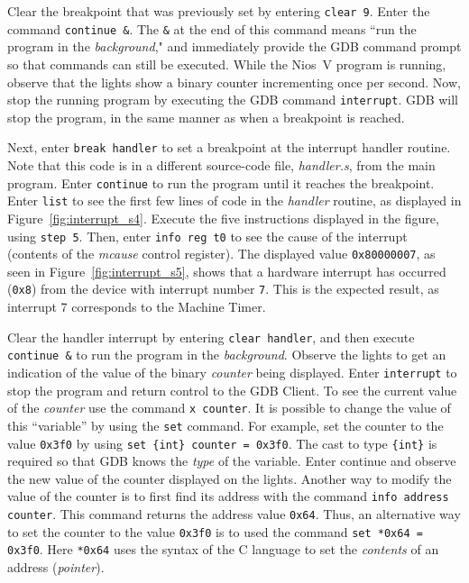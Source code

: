 \documentclass[11pt, twoside, pdftex]{article}
\newcommand{\red}[1]{{\color{red}\sf{#1}}}
\begin{document}
Clear the breakpoint that was previously set by entering \texttt{clear 9}. 
Enter the command \texttt{continue \&}. The \texttt{\&} at the end of this command means
``run the program in the {\it background}," and immediately provide the GDB command prompt so
that commands can still be executed. While the Nios~V program is running, observe that the 
\red{{\it LEDR}} lights show a binary counter incrementing once per second.  Now, stop the 
running program by executing the GDB command \texttt{interrupt}. GDB will stop the
program, in the same manner as when a breakpoint is reached.

Next, enter \texttt{break handler} to set a breakpoint at the interrupt handler routine.
Note that this code is in a different source-code file, {\it handler.s}, from the main program.
Enter \texttt{continue} to run the program until it reaches the breakpoint. Enter
\texttt{list} to see the first few lines of code in the {\it handler} routine, as displayed in
Figure~\ref{fig:interrupt_s4}. Execute the five instructions displayed in the figure, using
\texttt{step 5}. Then, enter \texttt{info reg t0} to see the cause of the interrupt
(contents of the {\it mcause} control register). The displayed value \texttt{0x80000007}, as 
seen in Figure~\ref{fig:interrupt_s5}, shows that a hardware interrupt has occurred (\texttt{0x8})
from the device with interrupt number \texttt{7}. This is the expected result, as
interrupt 7 corresponds to the Machine Timer. 

Clear the handler interrupt by entering \texttt{clear handler}, and then execute
\texttt{continue \&} to run the program in the {\it background}. 
Observe the \red{{\it LEDR}} lights to get an indication of the
value of the binary {\it counter} being displayed. Enter \texttt{interrupt} to stop the
program and return control to the GDB Client. To see the current value of the {\it counter}
use the command \texttt{x counter}. It is possible to change the value of this ``variable'' 
by using the \texttt{set} command. For example, set the counter to the value \texttt{0x3f0} by
using \texttt{set \{int\} counter = 0x3f0}. The cast to type \texttt{\{int\}} is required so that 
GDB knows the {\it type} of the variable. Enter continue and observe the new value of
the counter displayed on the \red{{\it LEDR}} lights. Another way to modify the value of
the counter is to first find its address with the command \texttt{info address counter}.
This command returns the address value \texttt{0x64}. Thus, an alternative way to set the 
counter to the value \texttt{0x3f0} is to used the command
\texttt{set *0x64 = 0x3f0}. Here \texttt{*0x64}
uses the syntax of the C language to set the {\it contents} of an address ({\it pointer}). 
\end{document}
